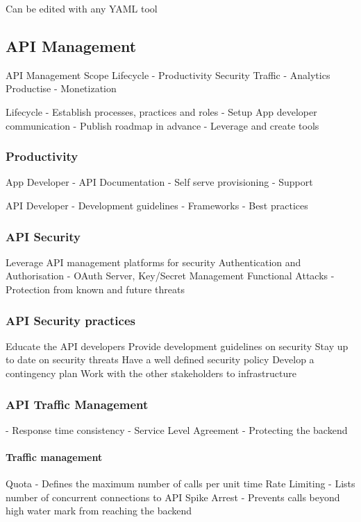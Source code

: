 \documentclass[a4paper, 11pt]{book}
\begin{document}
    Can be edited with any YAML tool

    \subsection{API Management}

    API Management Scope
    Lifecycle - Productivity
    Security
    Traffic - Analytics
    Productise - Monetization


    Lifecycle
    - Establish processes, practices and roles
    - Setup App developer communication
    - Publish roadmap in advance
    - Leverage and create tools

    \subsubsection{Productivity}
    App Developer
    - API Documentation
    - Self serve provisioning
    - Support

    API Developer
    - Development guidelines
    - Frameworks
    - Best practices

    \subsubsection{API Security}
    Leverage API management platforms for security
    Authentication and Authorisation - OAuth Server, Key/Secret Management
    Functional Attacks - Protection from known and future threats

    \subsubsection{API Security practices}
    Educate the API developers
    Provide development guidelines on security
    Stay up to date on security threats
    Have a well defined security policy
    Develop a contingency plan
    Work with the other stakeholders to infrastructure

    \subsubsection{API Traffic Management}
    - Response time consistency
    - Service Level Agreement
    - Protecting the backend

    \paragraph{Traffic management}
    Quota - Defines the maximum number of calls per unit time
    Rate Limiting - Lists number of concurrent connections to API
    Spike Arrest - Prevents calls beyond high water mark from reaching the backend %
\end{document}
